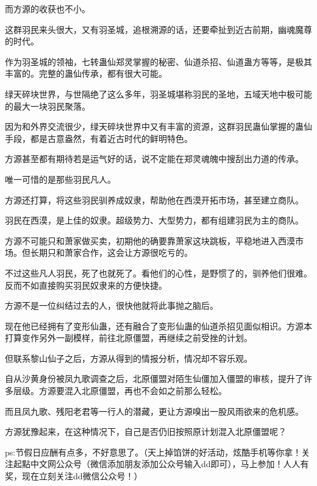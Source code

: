 \begin{this_body}
而方源的收获也不小。

这群羽民来头很大，又有羽圣城，追根溯源的话，还要牵扯到近古前期，幽魂魔尊的时代。

作为羽圣城的领袖，七转蛊仙郑灵掌握的秘密、仙道杀招、仙道蛊方等等，是极其丰富的。完整的蛊仙传承，都有很大可能。

绿天碎块世界，与世隔绝了这么多年，羽圣城堪称羽民的圣地，五域天地中极可能的最大一块羽民聚落。

因为和外界交流很少，绿天碎块世界中又有丰富的资源，这群羽民蛊仙掌握的蛊仙手段，都是古意盎然，有着近古时代的鲜明特色。

方源甚至都有期待若是运气好的话，说不定能在郑灵魂魄中搜刮出力道的传承。

唯一可惜的是那些羽民凡人。

方源还打算，将这些羽民驯养成奴隶，帮助他在西漠开拓市场，甚至建立商队。

羽民在西漠，是上佳的奴隶。超级势力、大型势力，都有组建羽民为主的商队。

方源不可能只和萧家做买卖，初期他的确要靠萧家这块跳板，平稳地进入西漠市场。但长期只和萧家合作，这会让方源很吃亏的。

不过这些凡人羽民，死了也就死了。看他们的心性，是野惯了的，驯养他们很难。反而不如直接购买羽民奴隶来的方便快捷。

方源不是一位纠结过去的人，很快他就将此事抛之脑后。

现在他已经拥有了变形仙蛊，还有融合了变形仙蛊的仙道杀招见面似相识。方源本打算变作另外一副模样，前往北原僵盟，再继续之前受挫的计划。

但联系黎山仙子之后，方源从得到的情报分析，情况却不容乐观。

自从沙黄身份被凤九歌调查之后，北原僵盟对陌生仙僵加入僵盟的审核，提升了许多层级。方源要混入北原僵盟，再也不会如之前那么轻松。

而且凤九歌、残阳老君等一行人的潜藏，更让方源嗅出一股风雨欲来的危机感。

方源犹豫起来，在这种情况下，自己是否仍旧按照原计划混入北原僵盟呢？

ps:节假日应酬有点多，不好意思了。（天上掉馅饼的好活动，炫酷手机等你拿！关注起點中文网公众号（微信添加朋友添加公众号输入dd即可），马上参加！人人有奖，现在立刻关注dd微信公众号！）

\end{this_body}


